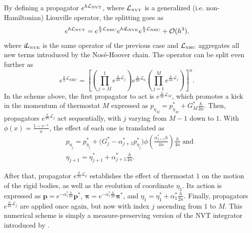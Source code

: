 \documentclass[
journal=jctcce,
layout=twocolumn
]{achemso}
\newcommand{\vt}[1]{\boldsymbol{\mathbf{#1}}}   %
\newcommand{\Liu}[1]{i\!L_\text{#1}}            %
\newcommand{\timestep}{h}
\begin{document}
By defining a propagator $e^{\timestep \mathcal{L}_\text{\tiny NVT}}$, where $\mathcal{L}_\text{\tiny NVT}$ is a generalized (i.e.
non-Hamiltonian) Liouville operator, the splitting goes as
\begin{equation}
\label{eq:splitting NVT}
e^{\timestep \mathcal{L}_\text{\tiny NVT}} = e^{\frac{\timestep}{2} \mathcal{L}_\text{\tiny NHC}} e^{\timestep \Liu{\tiny NVE}} e^{\frac{\timestep}{2} \mathcal{L}_\text{\tiny NHC}} + \mathcal{O}(\timestep^3),
\end{equation}
where $\Liu{\tiny NVE}$ is the same operator of the previous case and $\mathcal{L}_\text{\tiny NHC}$ aggregates all new terms introduced by the Nos\'e-Hoover chain.
The operator can be split even further as
\begin{equation*}
e^{\frac{\timestep}{2} \mathcal{L}_\text{NHC}} = \left[ \left( \textstyle\prod\limits_{j=M}^1 e^{\frac{\timestep}{4n} \mathcal{L}_j }\right) e^{\frac{\timestep}{2n} \mathcal{L}_0 } \left(  \textstyle\prod\limits_{j=1}^M e^{\frac{\timestep}{4n} \mathcal{L}_j }\right)  \right]^n.
\end{equation*}
In the scheme above, the first propagator to act is $e^{\frac{\timestep}{4n} \mathcal{L}_M}$, which promotes a kick in the momentum of thermostat $M$ expressed as $p_{\eta_M} = p_{\eta_M}^\ast + G_M^\ast \frac{\timestep}{4n}$.
Then, propagators $e^{\frac{\timestep}{4n} \mathcal{L}_j}$ act sequentially, with $j$ varying from $M-1$ down to $1$.
With $\phi(x) = \frac{1-e^{-x}}{x}$, the effect of each one is translated as \cite{Martyna_1996}
\begin{align*}
&p_{\eta_j} = p_{\eta_j}^\ast + \Big( G_j^\ast - \alpha_{j+1}^\ast p_{\eta_j}^\ast \Big) \phi\left(\frac{\alpha_{j+1}^\ast \timestep}{4n}\right) \frac{\timestep}{4n} \; \text{and} \\
&\eta_{j+1} = \eta_{j+1}^\ast + \alpha_{j+1}^\ast \frac{\timestep}{4n}.
\end{align*}

After that, propagator $e^{\frac{\timestep}{2n} \mathcal{L}_0}$ establishes the effect of thermostat $1$ on the motion of the rigid bodies, as well as the evolution of coordinate $\eta_1$.
Its action is expressed as ${\vt p} = e^{-\alpha_1^\ast \frac{\timestep}{2n}} {\vt p}^\ast$, ${\vt \pi} = e^{-\alpha_1^\ast \frac{\timestep}{2n}} {\vt \pi}^\ast$, and $\eta_1 = \eta_1^\ast + \alpha_1^\ast \frac{\timestep}{2n}$.
Finally, propagators $e^{\frac{\timestep}{4n} \mathcal{L}_j}$ are applied once again, but now with index $j$ ascending from $1$ to $M$.
This numerical scheme is simply a measure-preserving version of the NVT integrator introduced by \citeauthor{Martyna_1996} \cite{Martyna_1996}.
\end{document}
